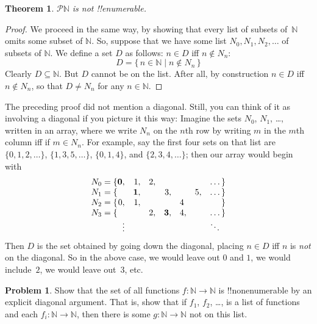 \documentclass[10pt,a4paper]{article}
\theoremstyle{plain}
\newtheorem{thm}{Theorem}[section]
\theoremstyle{definition}
\newtheorem{prob}{Problem}[section]
\theoremstyle{remark}
\newenvironment{explain}{}{}
\newcommand*{\ollabel}[1]{\label{#1}}
\providecommand{\Nat}{\ensuremath{\mathbb{N}}}
\providecommand{\Pow}{\mathcal{P}}
\providecommand{\Setabs}[2]{\{\, #1 \mid #2 \,\}}
\begin{document}
\begin{thm}
\ollabel{thm:nonenum-pownat}
$\Pow{\Nat}$ is not !!{enumerable}.
\end{thm}

\begin{proof}
We proceed in the same way, by showing that every list of subsets
of~$\Nat$ omits some subset of $\Nat$. So, suppose that we have some
list $N_0, N_1, N_2, \ldots$ of subsets of $\Nat$. We define a set $D$
as follows: $n \in D$ iff $n \notin N_{n}$:
\[
D = \Setabs{n \in \Nat}{n \notin N_n}
\]
Clearly $D\subseteq \Nat$. But $D$ cannot be on the list. After all,
by construction $n \in D$ iff $n\notin N_n$, so that $D \neq N_n$ for
any $n \in \Nat$. 
\end{proof}

\begin{explain}
The preceding proof did not mention a diagonal. Still, you can think
of it as involving a diagonal if you picture it this way: Imagine the
sets $N_0$, $N_1$, \dots, written in an array, where we write $N_n$ on
the $n$th row by writing $m$ in the $m$th column iff if $m \in N_n$.
For example, say the first four sets on that list are
$\{0,1,2,\dots\}$, $\{1, 3, 5, \dots\}$, $\{0,1,4\}$, and
$\{2,3,4,\dots\}$; then our array would begin with
\[
\begin{array}{r@{}rrrrrrr}
  N_0 = \{ & \mathbf{0}, & 1, & 2, & & & & \dots\}\\
  N_1 = \{ &  & \mathbf{1}, &  & 3, &  & 5, & \dots\}\\
  N_2 = \{ & 0, & 1, &  &  & 4\phantom{,} &  & \}\\
  N_3 = \{ &  &  & 2, & \mathbf{3}, & 4, & & \dots\}\\
  &\vdots & & & & & & \ddots\phantom{\}}
  \end{array}
\]
Then $D$ is the set obtained by going down the diagonal, placing $n
\in D$ iff $n$ is \emph{not} on the diagonal. So in the above case, we
would leave out $0$ and $1$, we would include~$2$, we would leave
out~$3$, etc.
\end{explain}

\begin{prob}
Show that the set of all functions $f \colon \Nat \to \Nat$ is
!!{nonenumerable} by an explicit diagonal argument. That is, show that
if $f_1$, $f_2$, \dots, is a list of functions and each $f_i\colon
\Nat \to \Nat$, then there is some $g \colon \Nat \to
\Nat$ not on this list.
\end{prob}

\end{document}
